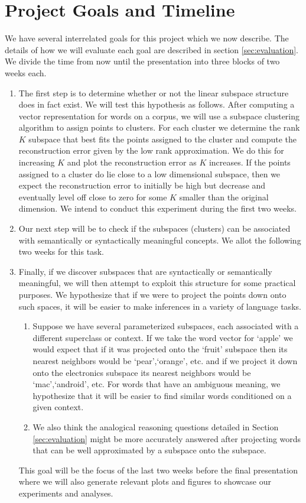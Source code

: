 \section{Project Goals	 and Timeline}\label{sec:timeline}

We have several interrelated goals for this project which we now describe. 
The details of how we will evaluate each goal are described in section \ref{sec:evaluation}.
We divide the time from now until the presentation into three blocks of two weeks each.
 \begin{enumerate}
\item The first step is to determine whether or not the linear subspace structure does in fact exist. 
We will test this hypothesis as follows. 
 After computing a vector representation for words on a corpus, we will use a subspace clustering algorithm to assign points to clusters. 
For each cluster we determine the rank $K$ subspace that best fits the points assigned to the cluster and compute the reconstruction error given by the low rank approximation. 
We do this for increasing $K$ and plot the reconstruction error as $K$ increases. 
If the points assigned to a cluster do lie close to a low dimensional subspace, then we expect the reconstruction error to initially be high but decrease and eventually level off close to zero for some $K$ smaller than the original dimension. 
We intend to conduct this experiment during the first two weeks.
 
\item Our next step will be to check if the subspaces (clusters) can be associated with semantically or syntactically meaningful concepts.
We allot the following two weeks for this task. 

\item Finally, if we discover subspaces that are syntactically or semantically meaningful, we will then attempt to exploit this structure for some practical purposes. 
We hypothesize that if we were to project the points down onto such spaces, it will be easier to make inferences in a variety of language tasks. 
	\begin{enumerate}
		\item Suppose we have several parameterized subspaces, each associated with a different superclass or context. 
If we take the word vector for `apple' we would expect that if it was projected onto the `fruit' subspace then its nearest neighbors would be `pear',`orange', etc. and if we project it down onto the electronics subspace its nearest neighbors would be `mac',`android', etc. 
For words that have an ambiguous meaning,  we hypothesize that it will be easier to find similar words conditioned on a given context. 
		\item We also think the analogical reasoning questions detailed in Section \ref{sec:evaluation} might be more accurately answered after projecting words that can be well approximated by a subspace onto the subspace. 
	\end{enumerate} 
	
This goal will be the focus of the last two weeks before the final presentation where we will also generate relevant plots and figures to showcase our experiments and analyses.
\end{enumerate}

